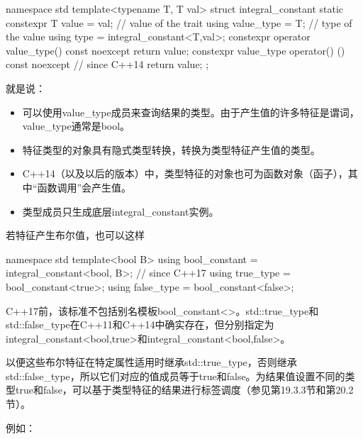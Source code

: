 \begin{cpp}
namespace std {
	template<typename T, T val>
	struct integral_constant {
		static constexpr T value = val; // value of the trait
		using value_type = T; // type of the value
		using type = integral_constant<T,val>;
		constexpr operator value_type() const noexcept {
			return value;
		}
		constexpr value_type operator() () const noexcept { // since C++14
			return value;
		}
	};
}
\end{cpp}

就是说：

\begin{itemize}
\item 
可以使用value\_type成员来查询结果的类型。由于产生值的许多特征是谓词，value\_type通常是bool。

\item 
特征类型的对象具有隐式类型转换，转换为类型特征产生值的类型。

\item 
C++14（以及以后的版本）中，类型特征的对象也可为函数对象（函子），其中“函数调用”会产生值。

\item 
类型成员只生成底层integral\_constant实例。
\end{itemize}

若特征产生布尔值，也可以这样

\begin{cpp}
	namespace std {
		template<bool B>
		using bool_constant = integral_constant<bool, B>; // since C++17
		using true_type = bool_constant<true>;
		using false_type = bool_constant<false>;
	}
\end{cpp}

\begin{notice}
C++17前，该标准不包括别名模板bool\_constant<>。std::true\_type和std::false\_type在C++11和C++14中确实存在，但分别指定为integral\_constant<bool,true>和integral\_constant<bool,false>。
\end{notice}

以便这些布尔特征在特定属性适用时继承std::true\_type，否则继承std::false\_type，所以它们对应的值成员等于true和false。为结果值设置不同的类型true和false，可以基于类型特征的结果进行标签调度（参见第19.3.3节和第20.2节）。

例如：

